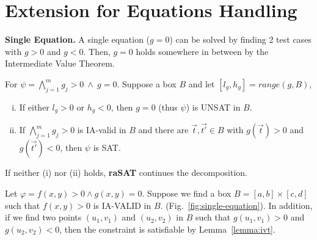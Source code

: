 \documentclass[runningheads,a4paper,oribibl]{llncs}
\newcommand{\suppress}[1]{} %
\begin{document}
\section{Extension for Equations Handling} \label{sec:eq}

\medskip \noindent 
\textbf{Single Equation.}
A single equation (${g=0}$) can be solved by finding 2 test cases with $g > 0$ and $g < 0$.
Then, $g=0$ holds somewhere in between by the Intermediate Value Theorem.

\begin{lemma} \label{lemma:ivt}
For $\psi =
\bigwedge \limits_{j=1}^m g_j > 0~\wedge~g = 0$.
Suppose a box
$B$
and
let ${[l_g, h_g] = range(g, B)}$, 
\begin{enumerate}[(i)]
\item If either $l_g > 0$ or $h_g < 0$, then $g = 0$ (thus $\psi$) is UNSAT in $B$. 
\item If $\bigwedge \limits_{j=1}^m g_j > 0$ is IA-valid in $B$ and there are $\vec{t},\vec{t'} \in B$
  with $g(\vec{t}) > 0$ and $g(\vec{t'}) < 0$, then $\psi$ is SAT.
\end{enumerate}
\end{lemma}

\suppress{
\begin{proof}
\begin{enumerate}[(i)]
\item If $l_g > 0$ or $h_g < 0$, then $g=0$ cannot be satisfied in box $I$.
  As a result, $F$ is UNSAT in $I$. 
\item If there are two instances $\vec{t},\vec{t'}$ in the box with
  $g(\vec{t}) > 0$ and $g(\vec{t'}) < 0$, it is clear from the Intermediate
  Value Theorem that there exist one point $\vec{t_0}$ between $\vec{t}$ and
  $\vec{t'}$ such that $g(\vec{t_0}) = 0$. In addition, because
  $\bigwedge \limits_{j}^m f_j > 0$ is IA-VALID in $I$, $\vec{t_0}$ also
  satisfies $\bigwedge \limits_{j}^m f_j > 0$.
  As a result, $F$ is satisfiable with $\vec{t_0}$ as the SAT instance.
\end{enumerate}
\end{proof}
}
If neither (i) nor (ii) holds, \textbf{raSAT} continues the decomposition.
\begin{example}
  Let $\varphi = f(x, y) > 0 \wedge g(x, y) = 0$.
  Suppose we find a box 
  ${B = [a, b] \times [c, d]}$
  such that $f(x, y) > 0$ is IA-VALID in $B$.
  (Fig.~\ref{fig:single-equation}).
  In addition, 
  if we find two points $(u_1, v_1)$ and $(u_2, v_2)$ in $B$ such that
  $g(u_1, v_1) > 0$ and $g(u_2, v_2) < 0$,
  then the constraint is satisfiable by Lemma~\ref{lemma:ivt}. 
\end{example}
\end{document}
